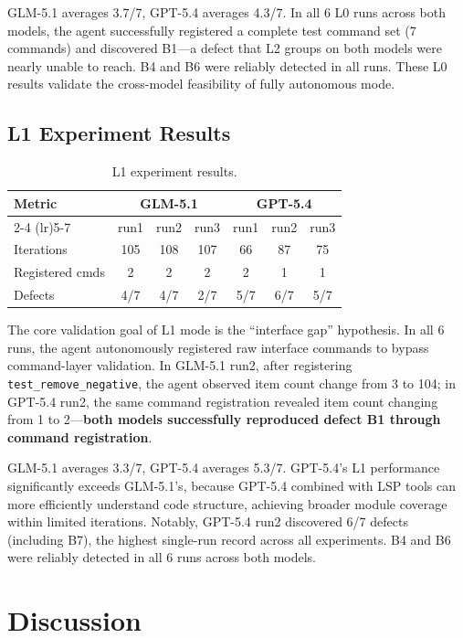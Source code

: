 \documentclass[sigconf,nonacm]{acmart}
\begin{document}
GLM-5.1 averages 3.7/7, GPT-5.4 averages 4.3/7. In all 6 L0 runs across both models, the agent successfully registered a complete test command set (7 commands) and discovered B1---a defect that L2 groups on both models were nearly unable to reach. B4 and B6 were reliably detected in all runs. These L0 results validate the cross-model feasibility of fully autonomous mode.

\subsection{L1 Experiment Results}

\begin{table}[t]
\caption{L1 experiment results.}
\label{tab:l1}
\small
\begin{tabular}{lcccccc}
\toprule
Metric & \multicolumn{3}{c}{GLM-5.1} & \multicolumn{3}{c}{GPT-5.4} \\
\cmidrule(lr){2-4} \cmidrule(lr){5-7}
 & run1 & run2 & run3 & run1 & run2 & run3 \\
\midrule
Iterations & 105 & 108 & 107 & 66 & 87 & 75 \\
Registered cmds & 2 & 2 & 2 & 2 & 1 & 1 \\
Defects & 4/7 & 4/7 & 2/7 & 5/7 & 6/7 & 5/7 \\
\bottomrule
\end{tabular}
\end{table}

The core validation goal of L1 mode is the ``interface gap'' hypothesis. In all 6 runs, the agent autonomously registered raw interface commands to bypass command-layer validation. In GLM-5.1 run2, after registering \texttt{test\_remove\_negative}, the agent observed item count change from 3 to 104; in GPT-5.4 run2, the same command registration revealed item count changing from 1 to 2---\textbf{both models successfully reproduced defect B1 through command registration}.

GLM-5.1 averages 3.3/7, GPT-5.4 averages 5.3/7. GPT-5.4's L1 performance significantly exceeds GLM-5.1's, because GPT-5.4 combined with LSP tools can more efficiently understand code structure, achieving broader module coverage within limited iterations. Notably, GPT-5.4 run2 discovered 6/7 defects (including B7), the highest single-run record across all experiments. B4 and B6 were reliably detected in all 6 runs across both models.

\section{Discussion}
\end{document}
